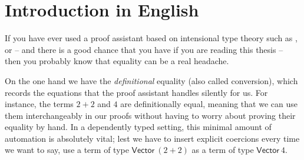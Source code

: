\setchapterpreamble[u]{\margintoc}
\chapter{Introduction in English}




If you have ever used a proof assistant based on intensional type theory such as
\Coq, \Agda or {\Lean} -- and there is a good chance that you have if you are 
reading this thesis -- then you probably know that equality can be a real headache.

On the one hand we have the \emph{definitional} equality (also called conversion), which records the 
equations that the proof assistant handles silently for us.
% 
% 
For instance, the terms \( 2+2 \) and \( 4 \) are definitionally equal, meaning that we 
can use them interchangeably in our proofs without having to worry about 
proving their equality by hand.
% 
In a dependently typed setting, this minimal amount of automation is absolutely vital; 
lest we have to insert explicit coercions every time we want to say, use a term 
of type \( \mathsf{Vector}\ (2+2) \) as a term of type \( \mathsf{Vector}\ 4 \).

